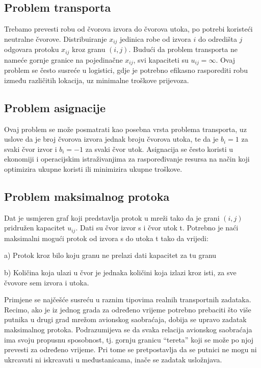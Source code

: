 \documentclass[11pt, a4paper]{article}
\begin{document}
		\subsection*{Problem transporta}
		
		Trebamo prevesti robu od čvorova izvora do čvorova utoka, po potrebi koristeći neutralne čvorove. Distribuiranje \(x_{ij}\) jedinica robe od izvora \(i\) do odredišta \(j\) odgovara protoku \(x_{ij}\) kroz granu $(i,j)$. Budući da problem transporta ne nameće gornje granice na pojedinačne \(x_{ij}\), svi kapaciteti su \(u_{ij} = \infty\). Ovaj problem se često susreće u logistici, gdje je potrebno efikasno rasporediti robu između različitih lokacija, uz minimalne troškove prijevoza.
		
		\subsection*{Problem asignacije}
		
		Ovaj problem se može posmatrati kao posebna vrsta problema transporta, uz uslove da je broj čvorova izvora jednak broju čvorova utoka, te da je \(b_i = 1\) za svaki čvor izvor i \(b_i = -1\) za svaki čvor utok. Asignacija se često koristi u ekonomiji i operacijskim istraživanjima za raspoređivanje resursa na način koji optimizira ukupne koristi ili minimizira ukupne troškove.
		
		\subsection*{Problem maksimalnog protoka}
		
		Dat je usmjeren graf koji predstavlja protok u mreži tako da je grani $(i,j)$ pridružen kapacitet $u_{ij}$. Dati su čvor izvor s i čvor utok t. Potrebno je naći maksimalni mogući protok od izvora s do utoka t tako da vrijedi:
	
		a) Protok kroz bilo koju granu ne prelazi dati kapacitet za tu granu
		
		b) Količina koja ulazi u čvor je jednaka količini koja izlazi kroz isti, za sve čvovore sem izvora i utoka.
		
		Primjene se najčešće susreću u raznim tipovima realnih transportnih zadataka. Recimo, ako je iz jednog grada za određeno vrijeme potrebno prebaciti što više putnika u drugi grad mrežom avionskog saobraćaja, dobija se upravo zadatak maksimalnog protoka. Podrazumijeva se da svaka relacija avionskog saobraćaja ima svoju propusnu sposobnost, tj. gornju granicu “tereta” koji se može po njoj prevesti za određeno vrijeme. Pri tome se pretpostavlja da se putnici ne mogu ni ukrcavati ni iskrcavati u međustanicama, inače se zadatak usložnjava.
		
\end{document}
